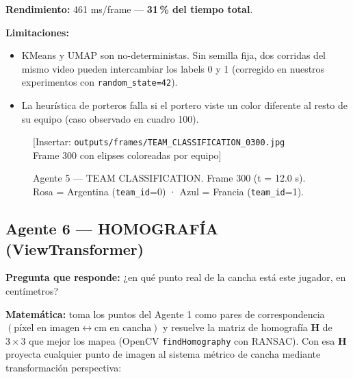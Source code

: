 \documentclass[11pt,a4paper]{article}
\begin{document}
\textbf{Rendimiento:} 461 ms/frame — \textbf{31\,\% del tiempo total}.

\begin{alertbox}
\textbf{Limitaciones:}
\begin{itemize}[noitemsep]
  \item KMeans y UMAP son no-deterministas. Sin semilla fija, dos corridas
        del mismo video pueden intercambiar los labels 0 y 1
        (corregido en nuestros experimentos con \texttt{random\_state=42}).
  \item La heurística de porteros falla si el portero viste un color diferente
        al resto de su equipo (caso observado en cuadro 100).
\end{itemize}
\end{alertbox}

\begin{figure}[H]
  \centering
  \begin{mdframed}[
    linecolor=gray!40, linewidth=1pt,
    innertopmargin=50pt, innerbottommargin=50pt,
    backgroundcolor=gray!8
  ]
    \centering\color{gray!60}
    [Insertar: \texttt{outputs/frames/TEAM\_CLASSIFICATION\_0300.jpg} \\
    Frame 300 con elipses coloreadas por equipo]
  \end{mdframed}
  \caption{Agente 5 — TEAM CLASSIFICATION. Frame 300 (t = 12.0 s).
           Rosa = Argentina (\texttt{team\_id}=0) ·
           Azul = Francia (\texttt{team\_id}=1).}
  \label{fig:team}
\end{figure}

\subsection{Agente 6 — HOMOGRAFÍA (ViewTransformer)}

\textbf{Pregunta que responde:} ¿en qué punto real de la cancha está
este jugador, en centímetros?

\textbf{Matemática:} toma los puntos del Agente 1 como pares de
correspondencia $(\text{píxel en imagen} \leftrightarrow \text{cm en cancha})$
y resuelve la matriz de homografía $\mathbf{H}$ de $3\times3$ que mejor los mapea
(OpenCV \texttt{findHomography} con RANSAC). Con esa $\mathbf{H}$ proyecta
cualquier punto de imagen al sistema métrico de cancha mediante
transformación perspectiva:
\end{document}
